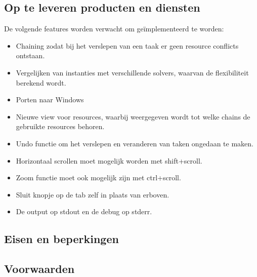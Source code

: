 \subsection{Op te leveren producten en diensten}
De volgende features worden verwacht om ge\"implementeerd te worden:
\begin{itemize}
\item Chaining zodat bij het verslepen van een taak er geen resource conflicts ontstaan.
\item Vergelijken van instanties met verschillende solvers, waarvan de flexibiliteit berekend wordt.
\item Porten naar Windows
\item Nieuwe view voor resources, waarbij weergegeven wordt tot welke chains de gebruikte resources behoren.
\item Undo functie om het verslepen en veranderen van taken ongedaan te maken.
\item Horizontaal scrollen moet mogelijk worden met shift+scroll.
\item Zoom functie moet ook mogelijk zijn met ctrl+scroll.
\item Sluit knopje op de tab zelf in plaats van erboven.
\item De output op stdout en de debug op stderr.
\end{itemize}

\subsection{Eisen en beperkingen}
\subsection{Voorwaarden}
